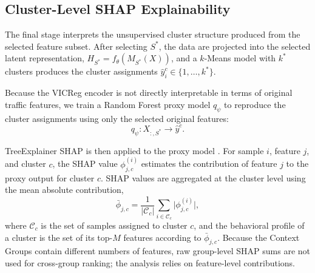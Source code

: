 \subsection{Cluster-Level SHAP Explainability}
\label{sec:xai_method}

The final stage interprets the unsupervised cluster structure produced from the selected feature subset. After selecting $S^{*}$, the data are projected into the selected latent representation, $H_{S^{*}} = f_\theta(M_{S^{*}}(X))$, and a $k$-Means model with $k^{*}$ clusters produces the cluster assignments $\hat{y}^{c}_i \in \{1,\dots,k^{*}\}$.

Because the VICReg encoder is not directly interpretable in terms of original traffic features, we train a Random Forest proxy model $q_\psi$ to reproduce the cluster assignments using only the selected original features:
\begin{equation}
q_\psi : X_{:,S^{*}} \rightarrow \hat{y}^{c}.
\end{equation}


TreeExplainer SHAP \cite{lundberg2017unified} is then applied to the proxy model . For sample $i$, feature $j$, and cluster $c$, the SHAP value $\phi^{(i)}_{j,c}$ estimates the contribution of feature $j$ to the proxy output for cluster $c$. SHAP values are aggregated at the cluster level using the mean absolute contribution,
\begin{equation}
\bar{\phi}_{j,c} = \frac{1}{|\mathcal{C}_c|}\sum_{i \in \mathcal{C}_c} \bigl|\phi^{(i)}_{j,c}\bigr| ,
\label{eq:clustershap}
\end{equation}
where $\mathcal{C}_c$ is the set of  samples assigned to cluster $c$, and the behavioral profile of a cluster is the set of its top-$M$ features according to $\bar{\phi}_{j,c}$. Because the Context Groups contain different numbers of features, raw group-level SHAP sums are not used for cross-group ranking; the analysis relies on feature-level contributions.

